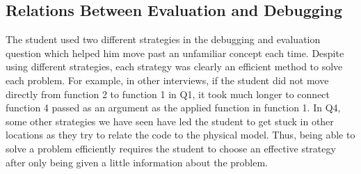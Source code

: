 \newpage
\subsection{Relations Between Evaluation and Debugging}
%
%

The student used two different strategies in the debugging and evaluation question which helped him move past an unfamiliar concept each time. Despite using different strategies, each strategy was clearly an efficient method to solve each problem. For example, in other interviews, if the student did not move directly from function 2 to function 1 in Q1, it took much longer to connect function 4 passed as an argument as the applied function in function 1. In Q4, some other strategies we have seen have led the student to get stuck in other locations as they try to relate the code to the physical model. Thus, being able to solve a problem efficiently requires the student to choose an effective strategy after only being given a little information about the problem. 





